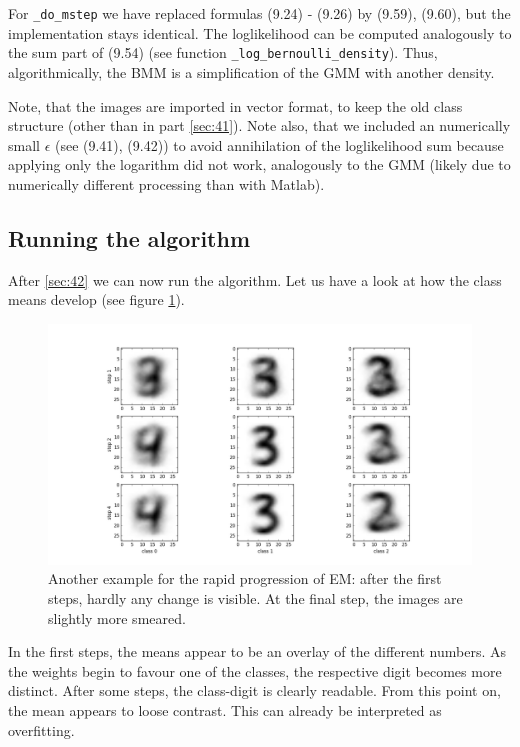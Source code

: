 For \texttt{\_do\_mstep} we have replaced formulas (9.24) - (9.26) by (9.59), (9.60), but the implementation stays identical. The loglikelihood can be computed analogously to the sum part of (9.54) (see function \texttt{\_log\_bernoulli\_density}). Thus, algorithmically, the BMM is a simplification of the GMM with another density.

Note, that the images are imported in vector format, to keep the old class structure (other than in part \ref{sec:41}). 
Note also, that we included an numerically small $\epsilon$ (see (9.41), (9.42)) to avoid annihilation of the loglikelihood sum because applying only the logarithm did not work, analogously to the GMM (likely due to numerically different processing than with Matlab).

\subsection{Running the algorithm}\label{sec:43}
After \ref{sec:42} we can now run the algorithm. Let us have a look at how the class means develop (see figure \ref{fig:42_means}).
\begin{figure}[H]
	\centering \includegraphics{../Figures/Ex43_means.png}
	\caption{Another example for the rapid progression of EM: after the first steps, hardly any change is visible. At the final step, the images are slightly more smeared.}
	\label{fig:42_means}
\end{figure}
In the first steps, the means appear to be an overlay of the different numbers. As the weights begin to favour one of the classes, the respective digit becomes more distinct. After some steps, the class-digit is clearly readable. From this point on, the mean appears to loose contrast. This can already be interpreted as overfitting.


